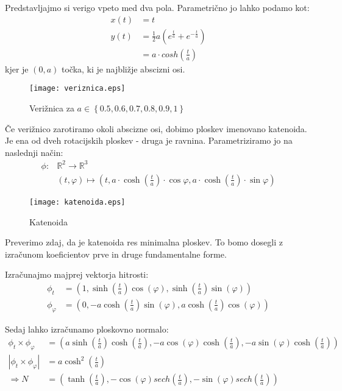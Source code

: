 \documentclass[mat1]{fmfdelo}
\newcommand{\R}{\mathbb R}
\begin{document}
\begin{primer}[Katenoida]
    Predstavljajmo si verigo vpeto med dva pola. Parametrično jo lahko podamo kot:
    \begin{align*}
        x(t) &= t \\
        y(t) &= \frac{1}{2}a\left( e^{\frac{t}{a}} + e^{-\frac{t}{a}} \right) \\
        &= a \cdot cosh\left( \frac{t}{a} \right) 
    \end{align*}
    kjer je $(0, a)$ točka, ki je najbližje abscizni osi.

    \begin{figure}[h]
        \texttt{[image: veriznica.eps]}
        \caption{Verižnica za $a \in \left\{ 0.5, 0.6, 0.7, 0.8, 0.9, 1\right\}$ }
    \end{figure}

    Če verižnico zarotiramo okoli abscizne osi, dobimo ploskev imenovano katenoida.
    Je ena od dveh rotacijskih ploskev - druga je ravnina. Parametriziramo jo na naslednji način:
    \begin{align*}
        \phi : & \R^2 \to \R^3 \\
        & (t, \varphi) \mapsto \left( t, a \cdot \cosh \left( \frac{t}{a} \right) \cdot \cos\varphi , a \cdot \cosh \left( \frac{t}{a} \right) \cdot \sin\varphi \right)
    \end{align*}

    \begin{figure}[h]
        \texttt{[image: katenoida.eps]}
        \caption{Katenoida}
    \end{figure}

    Preverimo zdaj, da je katenoida res minimalna ploskev. To bomo dosegli z izračunom koeficientov
    prve in druge fundamentalne forme.

    Izračunajmo majprej vektorja hitrosti:
    \begin{align*}
        \phi_t &= \left( 1, \sinh\left( \frac{t}{a} \right) \cos\left(\varphi\right) , \sinh\left( \frac{t}{a} \right) \sin\left(\varphi\right) \right) \\
        \phi_\varphi &= \left( 0, - a \cosh\left( \frac{t}{a} \right) \sin\left(\varphi\right) , a \cosh\left( \frac{t}{a} \right) \cos\left(\varphi\right) \right)
    \end{align*}

    Sedaj lahko izračunamo ploskovno normalo:
    \begin{align*}
        \phi_t \times \phi_\varphi &= \left( a \sinh\left( \frac{t}{a} \right) \cosh\left( \frac{t}{a} \right) , - a \cos\left(\varphi\right) \cosh\left( \frac{t}{a} \right) , - a \sin\left(\varphi\right) \cosh\left( \frac{t}{a} \right) \right) \\
        \left\lvert \phi_t \times \phi_\varphi \right\rvert &= a \cosh^2 \left( \frac{t}{a} \right) \\
        \Rightarrow N &= \left( \tanh \left( \frac{t}{a} \right) , - \cos \left( \varphi \right) sech \left( \frac{t}{a} \right) , - \sin \left( \varphi \right) sech \left( \frac{t}{a} \right) \right)
    \end{align*}


\end{primer}
\end{document}
